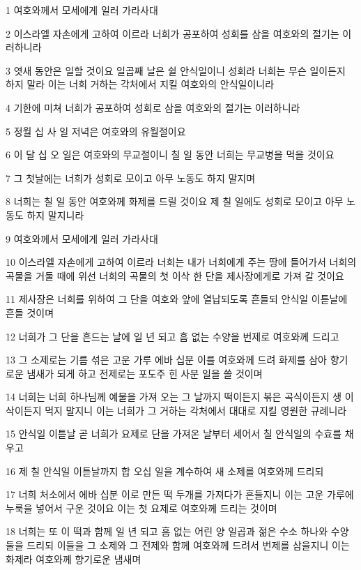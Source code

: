 \par 1 여호와께서 모세에게 일러 가라사대
\par 2 이스라엘 자손에게 고하여 이르라 너희가 공포하여 성회를 삼을 여호와의 절기는 이러하니라
\par 3 엿새 동안은 일할 것이요 일곱째 날은 쉴 안식일이니 성회라 너희는 무슨 일이든지 하지 말라 이는 너희 거하는 각처에서 지킬 여호와의 안식일이니라
\par 4 기한에 미쳐 너희가 공포하여 성회로 삼을 여호와의 절기는 이러하니라
\par 5 정월 십 사 일 저녁은 여호와의 유월절이요
\par 6 이 달 십 오 일은 여호와의 무교절이니 칠 일 동안 너희는 무교병을 먹을 것이요
\par 7 그 첫날에는 너희가 성회로 모이고 아무 노동도 하지 말지며
\par 8 너희는 칠 일 동안 여호와께 화제를 드릴 것이요 제 칠 일에도 성회로 모이고 아무 노동도 하지 말지니라
\par 9 여호와께서 모세에게 일러 가라사대
\par 10 이스라엘 자손에게 고하여 이르라 너희는 내가 너희에게 주는 땅에 들어가서 너희의 곡물을 거둘 때에 위선 너희의 곡물의 첫 이삭 한 단을 제사장에게로 가져 갈 것이요
\par 11 제사장은 너희를 위하여 그 단을 여호와 앞에 열납되도록 흔들되 안식일 이튿날에 흔들 것이며
\par 12 너희가 그 단을 흔드는 날에 일 년 되고 흠 없는 수양을 번제로 여호와께 드리고
\par 13 그 소제로는 기름 섞은 고운 가루 에바 십분 이를 여호와께 드려 화제를 삼아 향기로운 냄새가 되게 하고 전제로는 포도주 힌 사분 일을 쓸 것이며
\par 14 너희는 너희 하나님께 예물을 가져 오는 그 날까지 떡이든지 볶은 곡식이든지 생 이삭이든지 먹지 말지니 이는 너희가 그 거하는 각처에서 대대로 지킬 영원한 규례니라
\par 15 안식일 이튿날 곧 너희가 요제로 단을 가져온 날부터 세어서 칠 안식일의 수효를 채우고
\par 16 제 칠 안식일 이튿날까지 합 오십 일을 계수하여 새 소제를 여호와께 드리되
\par 17 너희 처소에서 에바 십분 이로 만든 떡 두개를 가져다가 흔들지니 이는 고운 가루에 누룩을 넣어서 구운 것이요 이는 첫 요제로 여호와께 드리는 것이며
\par 18 너희는 또 이 떡과 함께 일 년 되고 흠 없는 어린 양 일곱과 젊은 수소 하나와 수양 둘을 드리되 이들을 그 소제와 그 전제와 함께 여호와께 드려서 번제를 삼을지니 이는 화제라 여호와께 향기로운 냄새며
